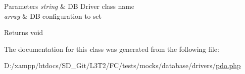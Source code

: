 \begin{DoxyParams}{Parameters}
{\em string} & D\+B Driver class name \\
\hline
{\em array} & D\+B configuration to set \\
\hline
\end{DoxyParams}
\begin{DoxyReturn}{Returns}
void 
\end{DoxyReturn}


The documentation for this class was generated from the following file\+:\begin{DoxyCompactItemize}
\item 
D\+:/xampp/htdocs/\+S\+D\+\_\+\+Git/\+L3\+T2/\+F\+C/tests/mocks/database/drivers/\hyperlink{pdo_8php}{pdo.\+php}\end{DoxyCompactItemize}
